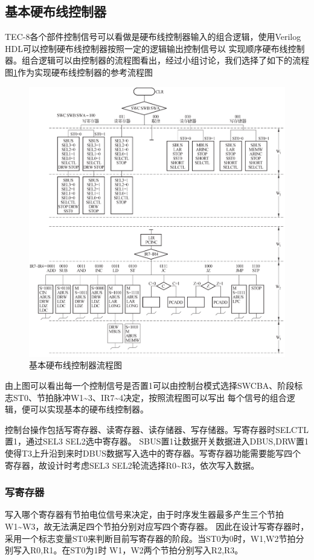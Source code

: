 \subsection{基本硬布线控制器}

TEC-8各个部件控制信号可以看做是硬布线控制器输入的组合逻辑，使用Verilog HDL可以控制硬布线控制器按照一定的逻辑输出控制信号以
实现顺序硬布线控制器。组合逻辑可以由控制器的流程图看出，经过小组讨论，我们选择了如下的流程图\ref{fig:basic_flowchart}作为实现硬布线控制器的参考流程图

\begin{figure}[htbp]
    \centering
    \includegraphics[width=0.8\linewidth]{figures/chapter2/basic_flowchart.png}
    \caption{基本硬布线控制器流程图}
    \label{fig:basic_flowchart}
\end{figure}

由上图可以看出每一个控制信号是否置1可以由控制台模式选择SWCBA、阶段标志ST0、节拍脉冲W1\~{}3、IR7\~{}4决定，按照流程图可以写出
每个信号的组合逻辑，便可以实现基本的硬布线控制器。

控制台操作包括写寄存器、读寄存器、读存储器、写存储器。写寄存器时SELCTL置1，通过SEL3 SEL2选中寄存器。
SBUS置1让数据开关数据进入DBUS,DRW置1使得T3上升沿到来时DBUS数据写入选中的寄存器。写寄存器功能需要能写四个
寄存器，故设计时考虑SEL3 SEL2轮流选择R0\~{}R3，依次写入数据。

\subsubsection{写寄存器}
写入哪个寄存器有节拍电位信号来决定，由于时序发生器最多产生三个节拍W1\~{}W3，故无法满足四个节拍分别对应写四个寄存器。
因此在设计写寄存器时，采用一个标志变量ST0来判断目前写寄存器的阶段。当ST0为0时，W1,W2节拍分别写入R0,R1。在ST0为1时
W1，W2两个节拍分别写入R2,R3。


